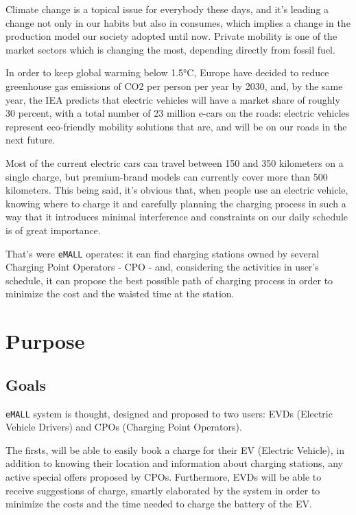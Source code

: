 Climate change is a topical issue for everybody these days, and it's leading a change not only in our habits but also in consumes, which implies a change in the production model our society adopted until now. Private mobility is one of the market sectors which is changing the most, depending directly from fossil fuel. 

In order to keep global warming below 1.5°C, Europe have decided to reduce greenhouse gas emissions of CO2 per
person per year by 2030, and, by the same year, the IEA predicts that electric vehicles will have a market share of roughly 30 percent, with a total number of 23 million e-cars on the roads: electric vehicles represent eco-friendly mobility solutions that are, and will be on our roads in the next future. 

Most of the current electric cars can travel between 150 and 350 kilometers on a single charge, but premium-brand models can currently cover more than 500 kilometers. This being said, it's obvious that, when people use an electric vehicle, knowing where to charge it and carefully planning the
charging process in such a way that it introduces minimal interference and constraints on our daily schedule
is of great importance.

That's were \verb|eMALL| operates: it can find charging stations owned by several Charging Point Operators - CPO - and,
considering the activities in user's schedule, it can propose the best possible path of charging process
in order to minimize the cost and the waisted time at the station.
\newpage


\section{Purpose}
\label{sec:purpose}%

\subsection{Goals}
\label{subsec:goals}%
\setcounter{g}{1}
\newcommand{\cg}{\theg\stepcounter{g}}
\verb|eMALL| system is thought, designed and proposed to two users: EVDs (Electric Vehicle Drivers) and CPOs (Charging Point Operators).

The firsts, will be able to easily book a charge for their EV (Electric Vehicle), in addition to knowing their location and information about charging stations, any active special offers proposed by CPOs. Furthermore, EVDs will be able to receive suggestions of charge, smartly elaborated by the system in order to minimize the costs and the time needed to charge the battery
of the EV\@.


